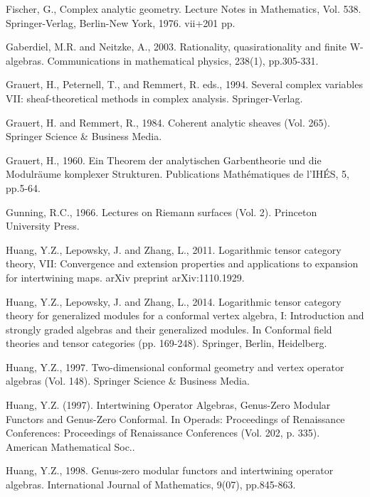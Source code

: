 \documentclass[11pt,b5paper,notitlepage]{article}
\theoremstyle{definition}
\theoremstyle{plain}
\numberwithin{equation}{section}
\begin{document}
\begin{thebibliography}{999999}
		Fischer, G., Complex analytic geometry. Lecture Notes in Mathematics, Vol. 538. Springer-Verlag, Berlin-New York, 1976. vii+201 pp.
		
		

Gaberdiel, M.R. and Neitzke, A., 2003. Rationality, quasirationality and finite W-algebras. Communications in mathematical physics, 238(1), pp.305-331.
		
		Grauert, H., Peternell, T., and Remmert, R. eds., 1994. Several complex variables VII: sheaf-theoretical methods in complex analysis. Springer-Verlag.
		
		Grauert, H. and Remmert, R., 1984. Coherent analytic sheaves (Vol. 265). Springer Science \& Business Media.
		
		Grauert, H., 1960. Ein Theorem der analytischen Garbentheorie und die Modulr\"aume komplexer Strukturen. Publications Math\'ematiques de l'IH\'ES, 5, pp.5-64.
		
Gunning, R.C., 1966. Lectures on Riemann surfaces (Vol. 2). Princeton University Press.

Huang, Y.Z., Lepowsky, J. and Zhang, L., 2011. Logarithmic tensor category theory, VII: Convergence and extension properties and applications to expansion for intertwining maps. arXiv preprint arXiv:1110.1929.

Huang, Y.Z., Lepowsky, J. and Zhang, L., 2014. Logarithmic tensor category theory for generalized modules for a conformal vertex algebra, I: Introduction and strongly graded algebras and their generalized modules. In Conformal field theories and tensor categories (pp. 169-248). Springer, Berlin, Heidelberg.
	


		
		Huang, Y.Z., 1997. Two-dimensional conformal geometry and vertex operator algebras (Vol. 148). Springer Science \& Business Media.
		

Huang, Y.Z. (1997). Intertwining Operator Algebras, Genus-Zero Modular Functors and Genus-Zero Conformal. In Operads: Proceedings of Renaissance Conferences: Proceedings of Renaissance Conferences (Vol. 202, p. 335). American Mathematical Soc..	

Huang, Y.Z., 1998. Genus-zero modular functors and intertwining operator algebras. International Journal of Mathematics, 9(07), pp.845-863.		
		

\end{thebibliography}
\end{document}
